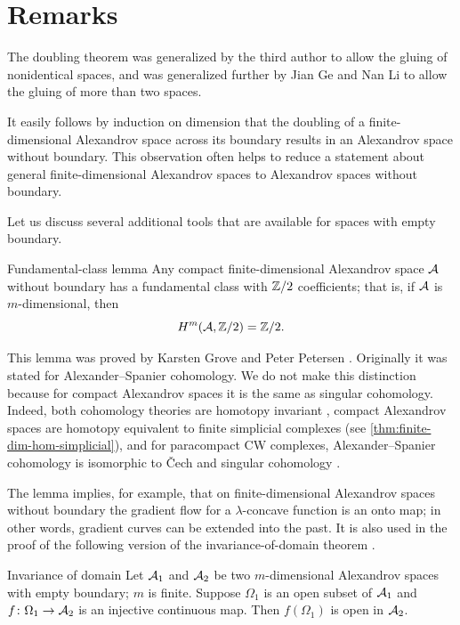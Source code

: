 \section{Remarks}\label{sec:bry-remarks}


The doubling theorem was generalized by the third author \cite{petrunin1997} to allow the gluing of nonidentical spaces, and was generalized further by Jian Ge and Nan Li \cite{ge-li} to allow the gluing of more than two spaces.

It easily follows by induction on dimension that the doubling of a finite-dimensional Alexandrov space across its boundary results in an Alexandrov space without boundary.
This observation often helps to reduce a statement about general finite-dimensional Alexandrov spaces to Alexandrov spaces without boundary.

Let us discuss several additional tools that are available for spaces with empty boundary.

\begin{thm}{Fundamental-class lemma}\label{lem:fund-class}
Any compact finite-dimensional Alexandrov space $\mathcal{A}$ without boundary has a fundamental class with $\mathbb{Z}/2$ coefficients;
that is, if $\mathcal{A}$ is $m$-dimensional, then
\[H^m(\mathcal{A},\mathbb{Z}/2)=\mathbb{Z}/2.\]

\end{thm}

This lemma was proved by Karsten Grove and Peter Petersen \cite{grove-petersen1993}.
Originally it was stated for Alexander--Spanier cohomology.
We do not make this distinction because for compact Alexandrov spaces it is the same as singular cohomology.
Indeed, both cohomology theories are homotopy invariant \cite[Chapter 6]{Spanier}, compact Alexandrov spaces are homotopy equivalent to finite simplicial complexes (see \ref{thm:finite-dim-hom-simplicial}), and for paracompact CW complexes, Alexander--Spanier cohomology is isomorphic to Čech and singular cohomology \cite[Chapter 6]{Spanier}.

The lemma implies, for example, that on finite-dimensional Alexandrov spaces without boundary
the gradient flow for a $\lambda$-concave function is an onto map;
in other words, gradient curves can be extended into the past.
It is also used in the proof of the following version of the invariance-of-domain theorem \cite[Theorem 3.2]{kapovitch-zhu}.

\begin{thm}{Invariance of domain}\label{thm-inv-domain}
Let $\mathcal{A}_1$ and $\mathcal{A}_2$ be two $m$-dimensional Alexandrov spaces with empty boundary; $m$ is finite.
Suppose $\Omega_1$ is an open subset of $\mathcal{A}_1$ and $f\colon\Omega_1\to \mathcal{A}_2$ is an injective continuous map.
Then $f(\Omega_1)$ is open in $\mathcal{A}_2$.
\end{thm}

